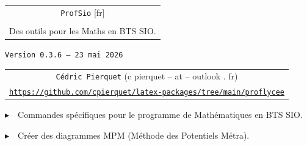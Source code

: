 \documentclass[french,a4paper,11pt]{article}
\def\TPversion{0.3.6}
\def\TPdate{23 mai 2026}
\begin{document}
\setlength{\aweboxleftmargin}{0.07\linewidth}
\setlength{\aweboxcontentwidth}{0.93\linewidth}
\setlength{\aweboxvskip}{8pt}

\pagestyle{fancy}

\thispagestyle{empty}

\vspace{2cm}

\begin{center}
	\begin{minipage}{0.75\linewidth}
	\begin{tcolorbox}[colframe=yellow,colback=yellow!15]
		\begin{center}
			\begin{tabular}{c}
				{\Huge \texttt{ProfSio} [fr]}\\
				\\
				{\LARGE Des outils pour les Maths en BTS SIO.} \\
			\end{tabular}

			\bigskip

			{\small \texttt{Version \TPversion{} -- \TPdate}}
		\end{center}
	\end{tcolorbox}
\end{minipage}
\end{center}

\begin{center}
	\begin{tabular}{c}
	\texttt{Cédric Pierquet} ({\ttfamily c pierquet -- at -- outlook . fr})\\
	\texttt{\url{https://github.com/cpierquet/latex-packages/tree/main/proflycee}}
\end{tabular}
\end{center}

\vspace{0.15cm}

{$\blacktriangleright$~~Commandes spécifiques pour le programme de Mathématiques en BTS SIO\footnotemark{}.}

\vspace{0.15cm}

{$\blacktriangleright$~~Créer des diagrammes MPM\footnotemark{} (Méthode des Potentiels Métra).}
\end{document}
